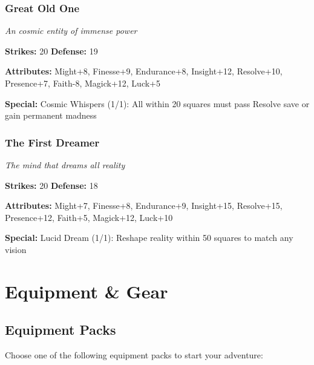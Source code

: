\documentclass[10pt,twoside]{article}
\begin{document}
\subsubsection{Great Old One}
\textit{An cosmic entity of immense power}

\textbf{Strikes:} 20 \quad \textbf{Defense:} 19

\textbf{Attributes:} Might+8, Finesse+9, Endurance+8, Insight+12, Resolve+10, Presence+7, Faith-8, Magick+12, Luck+5

\textbf{Special:} Cosmic Whispers (1/1): All within 20 squares must pass Resolve save or gain permanent madness

\subsubsection{The First Dreamer}
\textit{The mind that dreams all reality}

\textbf{Strikes:} 20 \quad \textbf{Defense:} 18

\textbf{Attributes:} Might+7, Finesse+8, Endurance+9, Insight+15, Resolve+15, Presence+12, Faith+5, Magick+12, Luck+10

\textbf{Special:} Lucid Dream (1/1): Reshape reality within 50 squares to match any vision

\clearpage

\section{Equipment \& Gear}

\subsection{Equipment Packs}
Choose one of the following equipment packs to start your adventure:
\end{document}
